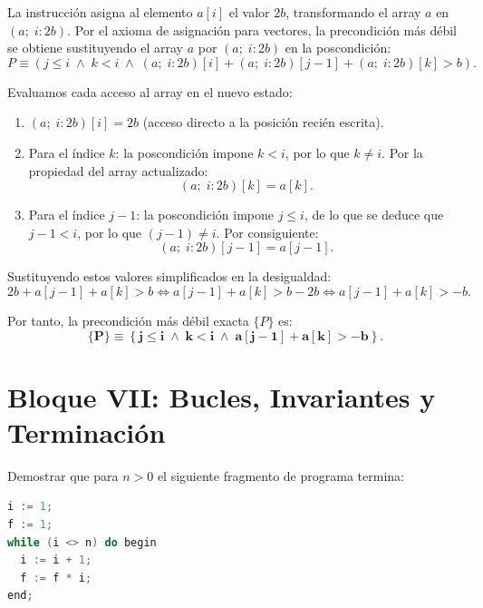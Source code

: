 \begin{solucion}
La instrucción asigna al elemento $a[i]$ el valor $2b$, transformando el array $a$ en $(a; \; i: 2b)$.
Por el axioma de asignación para vectores, la precondición más débil se obtiene sustituyendo el array $a$ por $(a; \; i: 2b)$ en la poscondición:
\[
P \equiv \left( j \le i \;\land\; k < i \;\land\; (a; \; i: 2b)[i] + (a; \; i: 2b)[j - 1] + (a; \; i: 2b)[k] > b \right).
\]

Evaluamos cada acceso al array en el nuevo estado:
\begin{enumerate}
    \item $(a; \; i: 2b)[i] = 2b$ (acceso directo a la posición recién escrita).
    \item Para el índice $k$: la poscondición impone $k < i$, por lo que $k \neq i$. Por la propiedad del array actualizado:
    \[
    (a; \; i: 2b)[k] = a[k].
    \]
    \item Para el índice $j - 1$: la poscondición impone $j \le i$, de lo que se deduce que $j - 1 < i$, por lo que $(j - 1) \neq i$. Por consiguiente:
    \[
    (a; \; i: 2b)[j - 1] = a[j - 1].
    \]
\end{enumerate}

Sustituyendo estos valores simplificados en la desigualdad:
\[
2b + a[j - 1] + a[k] > b \iff a[j - 1] + a[k] > b - 2b \iff a[j - 1] + a[k] > -b.
\]

Por tanto, la precondición más débil exacta $\{P\}$ es:
\[
\mathbf{\{P\} \equiv \left\{ j \le i \;\land\; k < i \;\land\; a[j - 1] + a[k] > -b \right\}}.
\]
\end{solucion}

\section{Bloque VII: Bucles, Invariantes y Terminación}

\begin{ejercicio}
Demostrar que para $n > 0$ el siguiente fragmento de programa termina:
\begin{lstlisting}[language=C++]
i := 1;
f := 1;
while (i <> n) do begin
  i := i + 1;
  f := f * i;
end;
\end{lstlisting}
\end{ejercicio}

